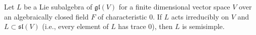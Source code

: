 Let $L$ be a Lie subalgebra of $\mathfrak{gl}(V)$ for a finite dimensional vector space $V$ over an algebraically closed field $F$ of characteristic $0$. If $L$ acts irreducibly on $V$ and $L \subset \mathfrak{sl}(V)$ (i.e., every element of $L$ has trace $0$), then $L$ is semisimple.
